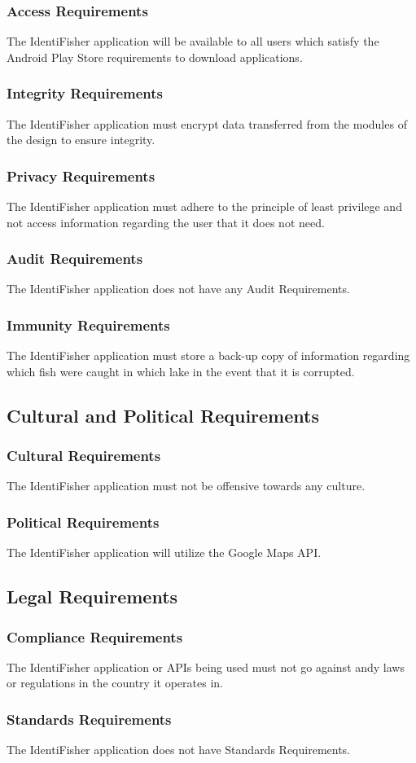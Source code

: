\documentclass{article}
\begin{document}
\subsubsection{Access Requirements}
The IdentiFisher application will be available to all users which satisfy the Android Play Store requirements to download applications.
\subsubsection{Integrity Requirements}
The IdentiFisher application must encrypt data transferred from the modules of the design to ensure integrity.
\subsubsection{Privacy Requirements}
The IdentiFisher application must adhere to the principle of least privilege and not access information regarding the user that it does not need.
\subsubsection{Audit Requirements}
The IdentiFisher application does not have any Audit Requirements.
\subsubsection{Immunity Requirements}
The IdentiFisher application must store a back-up copy of information regarding which fish were caught in which lake in the event that it is corrupted.

\subsection{Cultural and Political Requirements}
\subsubsection{Cultural Requirements}
The IdentiFisher application must not be offensive towards any culture.
\subsubsection{Political Requirements}
The IdentiFisher application will utilize the Google Maps API.

\subsection{Legal Requirements}
\subsubsection{Compliance Requirements}
The IdentiFisher application or APIs being used must not go against andy laws or regulations in the country it operates in.
\subsubsection{Standards Requirements}
The IdentiFisher application does not have Standards Requirements.

\newpage
\listoffigures
\end{document}
